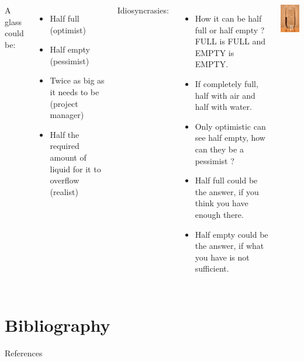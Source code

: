 \documentclass[
  ignorenonframetext,
  aspectratio=169]{beamer}
\begin{document}
\begin{frame}{}
\protect\hypertarget{section-6}{}
\begin{columns}
A glass could be:
\begin{itemize}
\footnotesize
\item Half full (optimist)
\item Half empty (pessimist)
\item Twice as big as it needs to be (project manager)
\item Half the required amount of liquid for it to overflow (realist)
\end{itemize}
Idiosyncrasies:
\begin{itemize}
\footnotesize
\item How it can be half full or half empty ? FULL is \alert{FULL} and EMPTY is \alert{EMPTY}.
\item If completely full, \alert{half with air and half with water}.
\item Only optimistic can \alert{see half empty}, how can they be a pessimist ?
\item Half full could be the answer, if you think you have \alert{enough} there.
\item Half empty could be the answer, if what you have is \alert{not sufficient}.
\end{itemize}


\includegraphics[width=0.8\linewidth]{./images/half-empty-glass} 

\end{columns}
\end{frame}

\hypertarget{bibliography}{%
\section{Bibliography}\label{bibliography}}

\begin{frame}{References}
\protect\hypertarget{references}{}
\end{frame}
\end{document}
